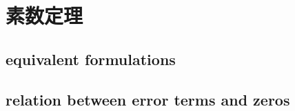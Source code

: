 \section{素数定理}
\label{b3:sec:2705}


\subsection{equivalent formulations}
\label{b3:subsec:270501}

\subsection{relation between error terms and zeros}
\label{b3:subsec:270502}


